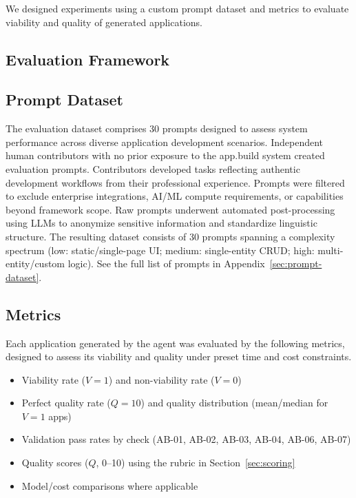 \documentclass[11pt]{article}
\begin{document}
We designed experiments using a custom prompt dataset and metrics to evaluate viability and quality of generated applications.

\subsection{Evaluation Framework}

\subsection{Prompt Dataset}
\label{sec:prompt-dataset-desc}

The evaluation dataset comprises 30 prompts designed to assess system performance across diverse application development scenarios. Independent human contributors with no prior exposure to the app.build system created evaluation prompts. Contributors developed tasks reflecting authentic development workflows from their professional experience. Prompts were filtered to exclude enterprise integrations, AI/ML compute requirements, or capabilities beyond framework scope. Raw prompts underwent automated post-processing using LLMs to anonymize sensitive information and standardize linguistic structure.
The resulting dataset consists of 30 prompts spanning a complexity spectrum (low: static/single-page UI; medium: single-entity CRUD; high: multi-entity/custom logic).
See the full list of prompts in Appendix~\ref{sec:prompt-dataset}.

\subsection{Metrics}

Each application generated by the agent was evaluated by the following metrics, designed to assess its viability and quality under preset time and cost constraints.

\begin{itemize}
\item Viability rate ($V=1$) and non-viability rate ($V=0$)
\item Perfect quality rate ($Q=10$) and quality distribution (mean/median for $V=1$ apps)
\item Validation pass rates by check (AB-01, AB-02, AB-03, AB-04, AB-06, AB-07)
\item Quality scores ($Q$, 0--10) using the rubric in Section~\ref{sec:scoring}
\item Model/cost comparisons where applicable
\end{itemize}
\end{document}
